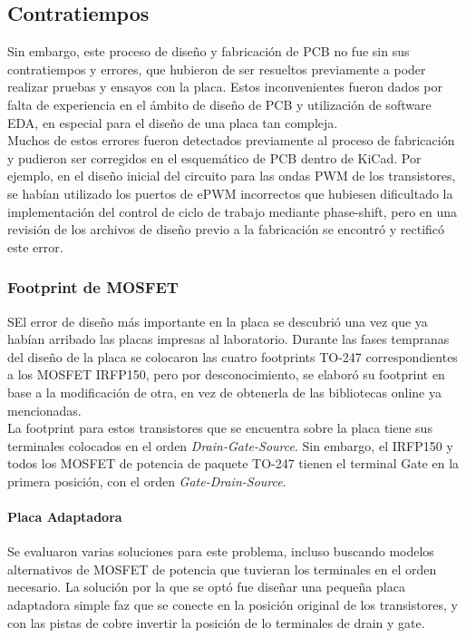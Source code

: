 \subsection{Contratiempos}

Sin embargo, este proceso de diseño y fabricación de PCB no fue sin sus contratiempos y errores, que hubieron de ser resueltos previamente a poder realizar pruebas y ensayos con la placa. Estos inconvenientes fueron dados por falta de experiencia en el ámbito de diseño de PCB y utilización de software EDA, en especial para el diseño de una placa tan compleja.\\

Muchos de estos errores fueron detectados previamente al proceso de fabricación y pudieron ser corregidos en el esquemático de PCB dentro de KiCad. Por ejemplo, en el diseño inicial del circuito para las ondas PWM de los transistores, se habían utilizado los puertos de ePWM incorrectos que hubiesen dificultado la implementación del control de ciclo de trabajo mediante phase-shift, pero en una revisión de los archivos de diseño previo a la fabricación se encontró y rectificó este error.\\

\subsubsection{Footprint de MOSFET}

SEl error de diseño más importante en la placa se descubrió una vez que ya habían arribado las placas impresas al laboratorio. Durante las fases tempranas del diseño de la placa se colocaron las cuatro footprints TO-247 correspondientes a los MOSFET IRFP150, pero por desconocimiento, se elaboró su footprint en base a la modificación de otra, en vez de obtenerla de las bibliotecas online ya mencionadas.\\

La footprint para estos transistores que se encuentra sobre la placa tiene sus terminales colocados en el orden \textit{Drain-Gate-Source}. Sin embargo, el IRFP150 y todos los MOSFET de potencia de paquete TO-247 tienen el terminal Gate en la primera posición, con el orden \textit{Gate-Drain-Source}.\\

\paragraph{Placa Adaptadora}

Se evaluaron varias soluciones para este problema, incluso buscando modelos alternativos de MOSFET de potencia que tuvieran los terminales en el orden necesario. La solución por la que se optó fue diseñar una pequeña placa adaptadora simple faz que se conecte en la posición original de los transistores, y con las pistas de cobre invertir la posición de lo terminales de drain y gate.\\

